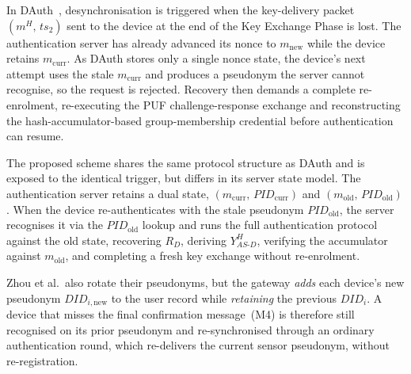 \documentclass[conference]{IEEEtran}
\begin{document}
In DAuth~\cite{das2026comsnets}, desynchronisation is triggered when the
key-delivery packet $(m^H,\, ts_2)$ sent to the device at the end of the Key
Exchange Phase is lost.
The authentication server has already advanced its nonce to $m_{\mathrm{new}}$
while the device retains $m_{\mathrm{curr}}$.
As DAuth stores only a single nonce state, the device's next attempt uses the
stale $m_{\mathrm{curr}}$ and produces a pseudonym the server cannot recognise,
so the request is rejected.
Recovery then demands a complete re-enrolment, re-executing the PUF
challenge-response exchange and reconstructing the hash-accumulator-based
group-membership credential before authentication can resume.

The proposed scheme shares the same protocol structure as DAuth and is exposed
to the identical trigger, but differs in its server state model.
The authentication server retains a dual state,
$(m_{\mathrm{curr}},\,\mathit{PID}_{\mathrm{curr}})$ and
$(m_{\mathrm{old}},\,\mathit{PID}_{\mathrm{old}})$.
When the device re-authenticates with the stale pseudonym
$\mathit{PID}_{\mathrm{old}}$, the server recognises it via the
$\mathit{PID}_{\mathrm{old}}$ lookup and runs the full authentication protocol
against the old state, recovering $R_D$, deriving $Y_{AS\text{-}D}^H$,
verifying the accumulator against $m_{\mathrm{old}}$, and completing a fresh
key exchange without re-enrolment.

Zhou et al.\ also rotate their pseudonyms, but the gateway \emph{adds} each
device's new pseudonym $\mathit{DID}_{i,\mathrm{new}}$ to the user record while
\emph{retaining} the previous $\mathit{DID}_i$.
A device that misses the final confirmation message~(M4) is therefore still
recognised on its prior pseudonym and re-synchronised through an ordinary
authentication round, which re-delivers the current sensor pseudonym, without
re-registration.
\end{document}
